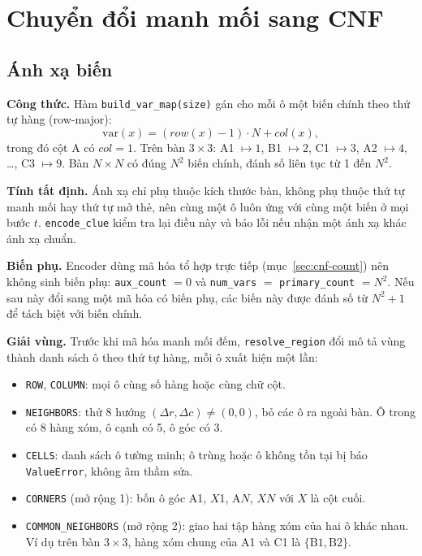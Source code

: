 \section{Chuyển đổi manh mối sang CNF}
\label{sec:cnf}

\subsection{Ánh xạ biến}
\textbf{Công thức.} Hàm \texttt{build\_var\_map(size)} gán cho mỗi ô một biến
chính theo thứ tự hàng (row-major):
\[
\mathrm{var}(x) = (\mathit{row}(x) - 1)\cdot N + \mathit{col}(x),
\]
trong đó cột A có $\mathit{col} = 1$. Trên bàn $3\times3$: A1 $\mapsto 1$,
B1 $\mapsto 2$, C1 $\mapsto 3$, A2 $\mapsto 4$, \ldots, C3 $\mapsto 9$. Bàn
$N\times N$ có đúng $N^2$ biến chính, đánh số liên tục từ 1 đến $N^2$.

\textbf{Tính tất định.} Ánh xạ chỉ phụ thuộc kích thước bàn, không phụ thuộc
thứ tự manh mối hay thứ tự mở thẻ, nên cùng một ô luôn ứng với cùng một biến
ở mọi bước $t$. \texttt{encode\_clue} kiểm tra lại điều này và báo lỗi nếu
nhận một ánh xạ khác ánh xạ chuẩn.

\textbf{Biến phụ.} Encoder dùng mã hóa tổ hợp trực tiếp (mục~\ref{sec:cnf-count})
nên không sinh biến phụ: \texttt{aux\_count} $= 0$ và
\texttt{num\_vars} $=$ \texttt{primary\_count} $= N^2$. Nếu sau này đổi sang
một mã hóa có biến phụ, các biến này được đánh số từ $N^2+1$ để tách biệt với
biến chính.

\textbf{Giải vùng.} Trước khi mã hóa manh mối đếm, \texttt{resolve\_region}
đổi mô tả vùng thành danh sách ô theo thứ tự hàng, mỗi ô xuất hiện một lần:
\begin{itemize}
    \item \texttt{ROW}, \texttt{COLUMN}: mọi ô cùng số hàng hoặc cùng chữ cột.
    \item \texttt{NEIGHBORS}: thử 8 hướng $(\Delta r,\Delta c)\ne(0,0)$, bỏ các
    ô ra ngoài bàn. Ô trong có 8 hàng xóm, ô cạnh có 5, ô góc có 3.
    \item \texttt{CELLS}: danh sách ô tường minh; ô trùng hoặc ô không tồn tại
    bị báo \texttt{ValueError}, không âm thầm sửa.
    \item \texttt{CORNERS} (mở rộng 1): bốn ô góc A1, $X$1, A$N$, $XN$ với $X$
    là cột cuối.
    \item \texttt{COMMON\_NEIGHBORS} (mở rộng 2): giao hai tập hàng xóm của
    hai ô khác nhau. Ví dụ trên bàn $3\times3$, hàng xóm chung của A1 và C1
    là $\{\text{B1},\text{B2}\}$.
\end{itemize}

